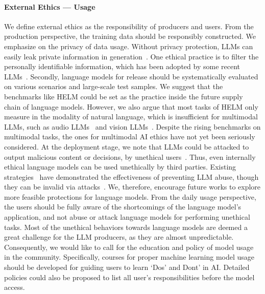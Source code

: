 \paragraph{External Ethics --- Usage} We define external ethics as the responsibility of producers and users. From the production perspective, the training data should be responsibly constructed. We emphasize on the privacy of data usage. Without privacy protection, LLMs can easily leak private information in generation~\cite{carlini2021extracting}. One ethical practice is to filter the personally identifiable information, which has been adopted by some recent LLMs~\cite{kandpal2022deduplicating,scao2022bloom,allal2023santacoder}. Secondly, language models for release should be systematically evaluated on various scenarios and large-scale test samples. We suggest that the benchmarks like HELM could be set as the practice inside the future supply chain of language models. However, we also argue that most tasks of HELM only measure in the modality of natural language, which is insufficient for multimodal LLMs, such as audio LLMs~\cite{yang2022diffsound,kreuk2022audiogen,borsos2022audiolm} and vision LLMs~\cite{zhang2021vinvl,borsos2022audiolm,zhou2022learning}. Despite the rising benchmarks on multimodal tasks, the ones for multimodal AI ethics have not yet been seriously considered. At the deployment stage, we note that LLMs could be attacked to output malicious content or decisions, by unethical users~\cite{goldstein2023generative, weidinger2021ethical}. Thus, even internally ethical language models can be used unethically by third parties. Existing strategies~\cite{he2022protecting,kirchenbauer2023watermark} have demonstrated the effectiveness of preventing LLM abuse, though they can be invalid via attacks~\cite{hecater}. We, therefore, encourage future works to explore more feasible protections for language models. From the daily usage perspective, the users should be fully aware of the shortcomings of the language model's application, and not abuse or attack language models for performing unethical tasks. Most of the unethical behaviors towards language models are deemed a great challenge for the LLM producers, as they are almost unpredictable. Consequently, we would like to call for the education and policy of model usage in the community. Specifically, courses for proper machine learning model usage should be developed for guiding users to learn `Dos' and Dont' in AI. Detailed policies could also be proposed to list all user's responsibilities before the model access.

